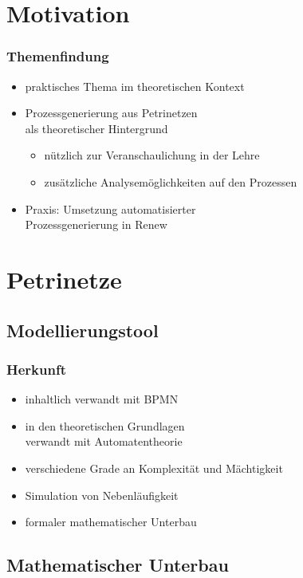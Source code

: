 
\section{Motivation}

\begin{frame}
	\frametitle{Themenfindung}
	\begin{itemize}
		\item praktisches Thema im theoretischen Kontext
		\item Prozessgenerierung aus Petrinetzen\\
			als theoretischer Hintergrund
		\begin{itemize}
			\item nützlich zur Veranschaulichung in der Lehre
			\item zusätzliche Analysemöglichkeiten auf den Prozessen	
		\end{itemize}
		\item Praxis: Umsetzung automatisierter\\
		Prozessgenerierung in Renew
	\end{itemize}
\end{frame}

\section{Petrinetze}
\subsection{Modellierungstool}
\begin{frame}
	\frametitle{Herkunft}
	
	\begin{itemize}
		\item inhaltlich verwandt mit BPMN
		\item in den theoretischen Grundlagen\\
		verwandt mit Automatentheorie
		\item verschiedene Grade an Komplexität und Mächtigkeit
		\item Simulation von Nebenläufigkeit
		\item formaler mathematischer Unterbau
	\end{itemize}
\end{frame}


\subsection{Mathematischer Unterbau}

